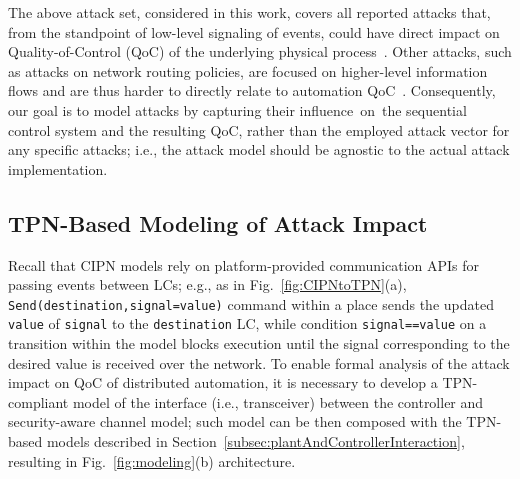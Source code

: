 The above attack set, considered in this work, covers all reported attacks that, from the standpoint of low-level signaling of events, could have direct impact on Quality-of-Control (QoC) of the underlying physical process~\cite{wang_arxiv19,wirelessControl}. %
Other attacks, such as attacks on {network routing policies}, are focused on higher-level information flows and are thus harder to directly relate to automation QoC~\cite{ackattack2}. Consequently, our goal is to model attacks by capturing their influence~on~the sequential control system and the resulting QoC, rather than the employed attack vector for any specific attacks; i.e., the attack model should be agnostic to the actual attack implementation.

\subsection{TPN-Based Modeling of Attack Impact}

Recall that CIPN models rely on platform-provided communication APIs for passing events between LCs; e.g., as in Fig.~\ref{fig:CIPNtoTPN}(a),
\verb!Send(destination,signal=value)! command within a place sends the updated \verb!value! of \verb!signal! to the \verb!destination! LC, while condition \verb!signal==value! on a transition within the model blocks execution until the signal corresponding to the desired value is received over the network. %
To %
enable formal analysis of the attack impact on QoC of distributed automation, it is necessary to develop a TPN-compliant model of the interface (i.e., transceiver) between the controller and security-aware channel model; such model can be then composed with the TPN-based models described in Section~\ref{subsec:plantAndControllerInteraction}, %
resulting in Fig.~\ref{fig:modeling}(b) architecture.

